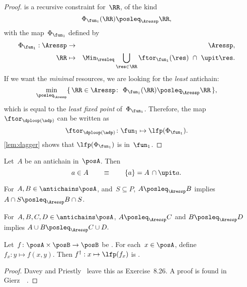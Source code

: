 \begin{proof}
     is a recursive constraint for~$\RR$, of the kind
    \begin{equation*}
        \Phi_{\fun_{1}}(\RR)\posleq_{\Aressp}\RR,
    \end{equation*}
    with the map~$\Phi_{\fun_{1}}$ defined by
    \begin{eqnarray}
        \Phi_{\fun_{1}}:\Aressp & \to     & \Aressp,\label{eq:bigphi}                                                           \\
        \RR                     & \mapsto & \Min_{\resleq}\bigcup_{\res\in\RR}\ftor_{\fun_{1}}(\res)\ \cap\ \upit\res.\nonumber
    \end{eqnarray}
    If we want the \emph{minimal} resources, we are looking for the \emph{least} antichain:
    \begin{equation*}
        \min_{\posleq_{\Aressp}}\{\,\RR\in\Aressp\colon\ \Phi_{\fun_{1}}(\RR)\posleq_{\Aressp}\RR\,\},
    \end{equation*}
    which is equal to the \emph{least fixed point }of~$\Phi_{\fun_{1}}$.
    Therefore, the map $\ftor_{\dploop(\adp)}$ can be written as
    \begin{equation}
        \ftor_{\dploop(\adp)}\colon\fun_{1}\mapsto\lfp(\Phi_{\fun_{1}}).
        \label{eq:loop_fixpoint}
    \end{equation}
    \cref{lem:dagger} shows that $\lfp(\Phi_{\fun_{1}})$ is \scottcontinuous in~$\fun_{1}$.
\end{proof}

\begin{lemma}
    \label{lem:antichain-write}
    Let~$A$ be an antichain in~$\posA$.
    Then
    \begin{equation*}
        a\in A\qquad\equiv\qquad\{a\}=A\,\cap\upit a.
    \end{equation*}
\end{lemma}

\begin{lemma}
    \label{lem:antichain_inter}
    For~$A,B\in\antichains\posA$, and~$S\subseteq P$,
    $A\posleq_{\Aressp}B$ implies $A\cap S\posleq_{\Aressp}B\cap S$.
\end{lemma}

\begin{lemma}
    \label{lem:antichain_union}
    For~$A,B,C,D\in\antichains\posA$, $A\posleq_{\Aressp}C$
    and $B\posleq_{\Aressp}D$ implies $A\cup B\posleq_{\Aressp}C\cup D.
    $
\end{lemma}

\begin{lemma}
    \label{lem:dagger}Let~$f\colon\posA\times\posB\to\posB$
    be \scottcontinuous.
    For each~$x\in\posA$, define $f_{x}:y\mapsto f(x,y).$
    Then $f^{\dagger}:x\mapsto\lfp(f_{x})$ is \scottcontinuous.
\end{lemma}
\begin{proof}
    Davey and Priestly~\cite{davey02} leave this as Exercise~8.26.
    A proof is found in Gierz~\etal~\cite[Exercise II-2.29]{gierz03continuous}.
\end{proof}

